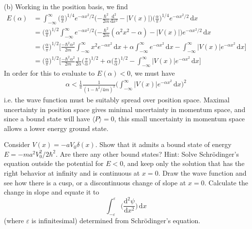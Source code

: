 \documentclass[../principles-of-quantum-mechanics.tex]{subfiles}
\begin{document}
\begin{questions}
\begin{solution}
		(b) Working in the position basis, we find
		\begin{align*}
			E(\alpha) &= \int_{-\infty}^{\infty}\Big(\frac{\alpha}{\pi}\Big)^{1/4}e^{-\alpha x^2/2}\Big({-\frac{\hbar^2}{2m}}\frac{\mathrm{d}^2}{\mathrm{d}x^2}-|V(x)|\Big)\Big(\frac{\alpha}{\pi}\Big)^{1/4}e^{-\alpha x^2/2}\,\mathrm{d}x \\
			&= \Big(\frac{\alpha}{\pi}\Big)^{1/2}\int_{-\infty}^{\infty}e^{-\alpha x^2/2}\Big({-\frac{\hbar^2}{2m}}(\alpha^2x^2 - \alpha) - |V(x)|\Big)e^{-\alpha x^2/2}\,\mathrm{d}x \\
			&= \Big(\frac{\alpha}{\pi}\Big)^{1/2}\Big[\frac{-\hbar^2\alpha^2}{2m}\int_{-\infty}^{\infty}x^2e^{-\alpha x^2}\,\mathrm{d}x + \alpha\int_{-\infty}^{\infty}e^{-\alpha x^2}\,\mathrm{d}x - \int_{-\infty}^{\infty}|V(x)|e^{-\alpha x^2}\,\mathrm{d}x\Big] \\
			&= \Big(\frac{\alpha}{\pi}\Big)^{1/2}\Big[\frac{-\hbar^2\alpha^2}{2m}\frac{1}{2\alpha}\Big(\frac{\pi}{\alpha}\Big)^{1/2} + \alpha\Big(\frac{\pi}{\alpha}\Big)^{1/2} - \int_{-\infty}^{\infty}|V(x)|e^{-\alpha x^2}\,\mathrm{d}x\Big]
		\end{align*}
		In order for this to evaluate to $E(\alpha) < 0$, we must have
		\begin{align*}
			\alpha < \frac{1}{\pi}\frac{1}{(1 - \hbar^2/4m)^2}\Big(\int_{-\infty}^{\infty}|V(x)|e^{-\alpha x^2}\,\mathrm{d}x\Big)^2
		\end{align*}
		i.e. the wave function must be suitably spread over position space. Maximal uncertainty in position space gives minimal uncertainty in momentum space, and since a bound state will have $\langle P\rangle = 0$, this small uncertainty in momentum space allows a lower energy ground state.
	\end{solution}
	
	\question Consider $V(x) = -aV_0\delta(x)$. Show that it admits a bound state of energy $E = -ma^2V_0^2/2\hbar^2$. Are there any other bound states? Hint: Solve Schr\"odinger's equation outside the potential for $E<0$, and keep only the solution that has the right behavior at infinity and is continuous at $x = 0$. Draw the wave function and see how there is a cusp, or a discontinuous change of slope at $x = 0$. Calculate the change in slope and equate it to
	$$\int_{-\varepsilon}^{\varepsilon}\Big(\frac{\mathrm{d}^2\psi}{\mathrm{d}x^2}\Big)\,\mathrm{d}x$$
	(where $\varepsilon$ is infinitesimal) determined from Schr\"odinger's equation.
	

\end{questions}
\end{document}
